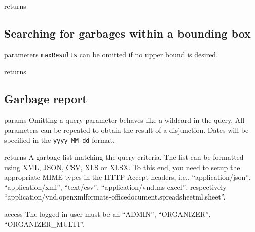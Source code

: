 \begin{apidata}{returns}
  \begin{datalist}
  \end{datalist}
\end{apidata}

\subsection{Searching for garbages within a bounding box}

\begin{apidata}{parameters}
  \texttt{maxResults} can be omitted if no upper bound is desired.
\end{apidata}
\begin{apidata}{returns}
  \begin{datalist}
  \end{datalist}
\end{apidata}

\subsection{Garbage report}

\begin{apidata}{params}
  Omitting a query parameter behaves like a wildcard in the query. All
  parameters can be repeated to obtain the result of a disjunction. Dates will
  be specified in the \texttt{yyyy-MM-dd} format.
\end{apidata}
\begin{apidata}{returns}
  A garbage list matching the query criteria. The list can be formatted using
  XML, JSON, CSV, XLS or XLSX. To this end, you need to setup the appropriate
  MIME types in the HTTP Accept headers, i.e., ``application/json'',
  ``application/xml'', ``text/csv'', ``application/vnd.ms-excel'', respectively
  ``application/vnd.openxmlformats-officedocument.spreadsheetml.sheet''.
\end{apidata}
\begin{apidata}{access}
The logged in user must be an ``ADMIN'', ``ORGANIZER'', ``ORGANIZER\_MULTI''. 
\end{apidata}



